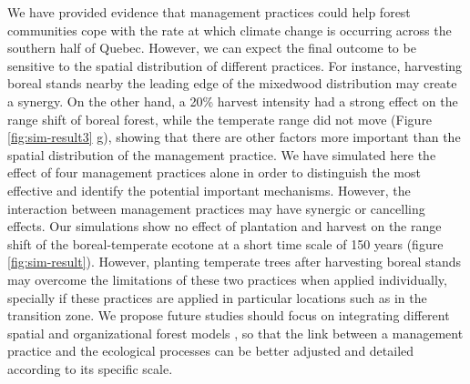 We have provided evidence that management practices could help forest
communities cope with the rate at which climate change is occurring
across the southern half of Quebec. However, we can expect the final
outcome to be sensitive to the spatial distribution of different
practices. For instance, harvesting boreal stands nearby the leading
edge of the mixedwood distribution may create a synergy. On the other
hand, a 20\% harvest intensity had a strong effect on the range shift of
boreal forest, while the temperate range did not move (Figure
\ref{fig:sim-result3} g), showing that there are other factors more
important than the spatial distribution of the management practice. We
have simulated here the effect of four management practices alone in
order to distinguish the most effective and identify the potential
important mechanisms. However, the interaction between management
practices may have synergic or cancelling effects. Our simulations show
no effect of plantation and harvest on the range shift of the
boreal-temperate ecotone at a short time scale of 150 years (figure
\ref{fig:sim-result}). However, planting temperate trees after
harvesting boreal stands may overcome the limitations of these two
practices when applied individually, specially if these practices are
applied in particular locations such as in the transition zone. We
propose future studies should focus on integrating different spatial and
organizational forest models \citep[e.g.~][]{talluto2016}, so that the
link between a management practice and the ecological processes can be
better adjusted and detailed according to its specific scale.

\newpage

\singlespacing
{\renewcommand{\bibname}{References}
\renewcommand{\bibsection}{\section{\bibname}}
}
